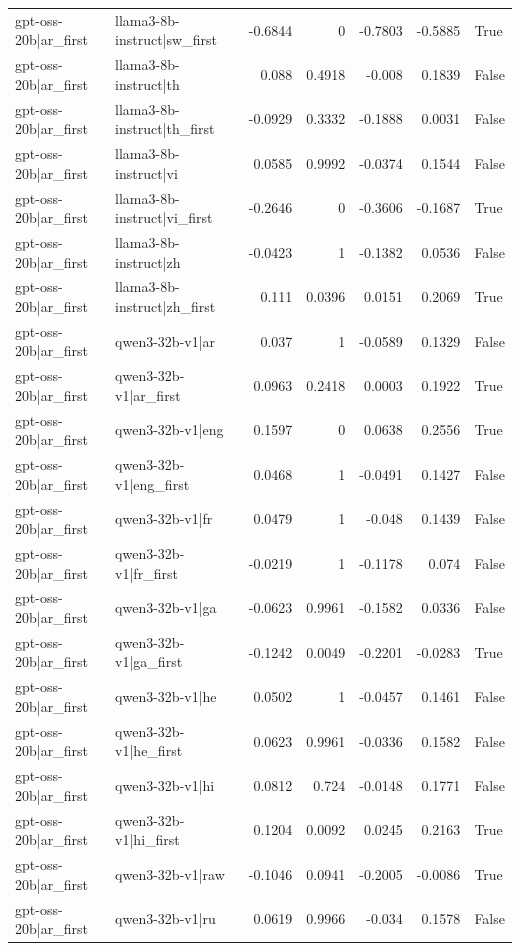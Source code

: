 \begin{table}
\begin{tabular}{l l r r r r l}
gpt-oss-20b|ar_first & llama3-8b-instruct|sw_first & -0.6844 & 0 & -0.7803 & -0.5885 & True \\
gpt-oss-20b|ar_first & llama3-8b-instruct|th & 0.088 & 0.4918 & -0.008 & 0.1839 & False \\
gpt-oss-20b|ar_first & llama3-8b-instruct|th_first & -0.0929 & 0.3332 & -0.1888 & 0.0031 & False \\
gpt-oss-20b|ar_first & llama3-8b-instruct|vi & 0.0585 & 0.9992 & -0.0374 & 0.1544 & False \\
gpt-oss-20b|ar_first & llama3-8b-instruct|vi_first & -0.2646 & 0 & -0.3606 & -0.1687 & True \\
gpt-oss-20b|ar_first & llama3-8b-instruct|zh & -0.0423 & 1 & -0.1382 & 0.0536 & False \\
gpt-oss-20b|ar_first & llama3-8b-instruct|zh_first & 0.111 & 0.0396 & 0.0151 & 0.2069 & True \\
gpt-oss-20b|ar_first & qwen3-32b-v1|ar & 0.037 & 1 & -0.0589 & 0.1329 & False \\
gpt-oss-20b|ar_first & qwen3-32b-v1|ar_first & 0.0963 & 0.2418 & 0.0003 & 0.1922 & True \\
gpt-oss-20b|ar_first & qwen3-32b-v1|eng & 0.1597 & 0 & 0.0638 & 0.2556 & True \\
gpt-oss-20b|ar_first & qwen3-32b-v1|eng_first & 0.0468 & 1 & -0.0491 & 0.1427 & False \\
gpt-oss-20b|ar_first & qwen3-32b-v1|fr & 0.0479 & 1 & -0.048 & 0.1439 & False \\
gpt-oss-20b|ar_first & qwen3-32b-v1|fr_first & -0.0219 & 1 & -0.1178 & 0.074 & False \\
gpt-oss-20b|ar_first & qwen3-32b-v1|ga & -0.0623 & 0.9961 & -0.1582 & 0.0336 & False \\
gpt-oss-20b|ar_first & qwen3-32b-v1|ga_first & -0.1242 & 0.0049 & -0.2201 & -0.0283 & True \\
gpt-oss-20b|ar_first & qwen3-32b-v1|he & 0.0502 & 1 & -0.0457 & 0.1461 & False \\
gpt-oss-20b|ar_first & qwen3-32b-v1|he_first & 0.0623 & 0.9961 & -0.0336 & 0.1582 & False \\
gpt-oss-20b|ar_first & qwen3-32b-v1|hi & 0.0812 & 0.724 & -0.0148 & 0.1771 & False \\
gpt-oss-20b|ar_first & qwen3-32b-v1|hi_first & 0.1204 & 0.0092 & 0.0245 & 0.2163 & True \\
gpt-oss-20b|ar_first & qwen3-32b-v1|raw & -0.1046 & 0.0941 & -0.2005 & -0.0086 & True \\
gpt-oss-20b|ar_first & qwen3-32b-v1|ru & 0.0619 & 0.9966 & -0.034 & 0.1578 & False \\

\end{tabular}
\end{table}
